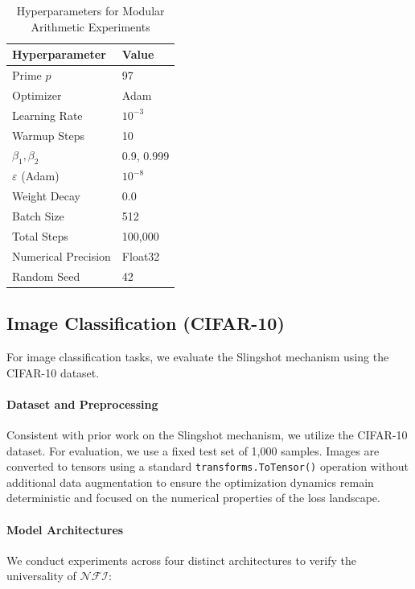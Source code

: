 \documentclass{article}
\theoremstyle{plain}
\theoremstyle{definition}
\theoremstyle{remark}
\begin{document}
\begin{table}[h]
\centering
\caption{Hyperparameters for Modular Arithmetic Experiments}
\label{tab:hyperparams-mod}
\begin{tabular}{ll}
\hline
\textbf{Hyperparameter} & \textbf{Value} \\ 
\hline
Prime $p$ & 97 \\
Optimizer & Adam \\
Learning Rate & $10^{-3}$ \\
Warmup Steps & 10 \\
$\beta_1, \beta_2$ & 0.9, 0.999 \\
$\varepsilon$ (Adam) & $10^{-8}$ \\
Weight Decay & 0.0 \\
Batch Size & 512 \\
Total Steps & 100,000 \\
Numerical Precision & Float32 \\
Random Seed & 42 \\
\hline
\end{tabular}
\end{table}

\subsection{Image Classification (CIFAR-10)}
For image classification tasks, we evaluate the Slingshot mechanism using the CIFAR-10 dataset.



\paragraph{Dataset and Preprocessing}
Consistent with prior work on the Slingshot mechanism, 
we utilize the CIFAR-10 dataset. 
For evaluation, we use a fixed test set of 1,000 samples. 
Images are converted to tensors using a standard \texttt{transforms.ToTensor()} operation 
without additional data augmentation to ensure the optimization dynamics remain deterministic and 
focused on the numerical properties of the loss landscape.



\paragraph{Model Architectures}
We conduct experiments across four distinct architectures to verify 
the universality of $\mathcal{NFI}$:
\end{document}
